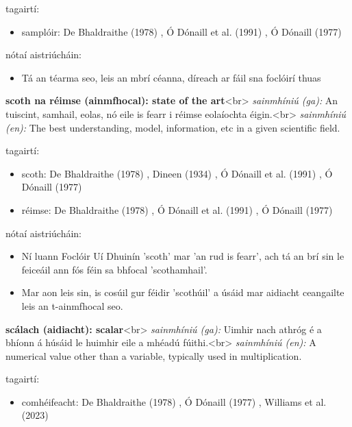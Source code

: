 \documentclass{article}
\begin{document}
tagairtí:
\begin{itemize}
	\item samplóir: De Bhaldraithe (1978) \cite{de-bhaldraithe}, Ó Dónaill et al. (1991) \cite{focloir-beag}, Ó Dónaill (1977) \cite{odonaill}
\end{itemize}

nótaí aistriúcháin:
\begin{itemize}
	\item Tá an téarma seo, leis an mbrí céanna, díreach ar fáil sna foclóirí thuas
\end{itemize}


\textbf{scoth na réimse (ainmfhocal): state of the art}<br>
\textit{sainmhíniú (ga):} An tuiscint, samhail, eolas, nó eile is fearr i réimse eolaíochta éigin.<br>
\textit{sainmhíniú (en):} The best understanding, model, information, etc in a given scientific field.

tagairtí:
\begin{itemize}
	\item scoth: De Bhaldraithe (1978) \cite{de-bhaldraithe}, Dineen (1934) \cite{dineen}, Ó Dónaill et al. (1991) \cite{focloir-beag}, Ó Dónaill (1977) \cite{odonaill}
	\item réimse: De Bhaldraithe (1978) \cite{de-bhaldraithe}, Ó Dónaill et al. (1991) \cite{focloir-beag}, Ó Dónaill (1977) \cite{odonaill}
\end{itemize}

nótaí aistriúcháin:
\begin{itemize}
	\item Ní luann Foclóir Uí Dhuinín 'scoth' mar 'an rud is fearr', ach tá an brí sin le feiceáil ann fós féin sa bhfocal 'scothamhail'.
	\item Mar aon leis sin, is cosúil gur féidir 'scothúil' a úsáid mar aidiacht ceangailte leis an t-ainmfhocal seo.
\end{itemize}


\textbf{scálach (aidiacht): scalar}<br>
\textit{sainmhíniú (ga):} Uimhir nach athróg é a bhíonn á húsáid le huimhir eile a mhéadú fúithi.<br>
\textit{sainmhíniú (en):} A numerical value other than a variable, typically used in multiplication.

tagairtí:
\begin{itemize}
	\item comhéifeacht: De Bhaldraithe (1978) \cite{de-bhaldraithe}, Ó Dónaill (1977) \cite{odonaill}, Williams et al. (2023) \cite{storchiste}
\end{itemize}
\end{document}
